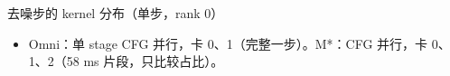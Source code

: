 \begin{frame}[t]{去噪步的 kernel 分布（单步，rank 0）}
\scriptsize\def\codesize{\relax}
\renewcommand{\arraystretch}{1.08}\setlength{\tabcolsep}{3pt}

\vspace{4pt}
\begin{itemize}\scriptsize\setlength\itemsep{1pt}
  \item Omni：单 stage CFG 并行，卡 0、1（完整一步）。M*：CFG 并行，卡 0、1、2（58 ms 片段，只比较占比）。
\end{itemize}
\end{frame}
